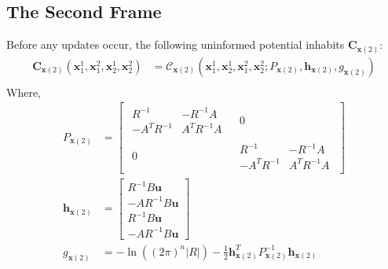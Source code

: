 \subsection{The Second Frame}
\label{subsection:the_second_frame}
Before any updates occur, the following uninformed potential inhabits $\pmb{C}_{\pmb{x}(2)}$:
\begin{align*}
\pmb{C}_{\pmb{x} \left( 2 \right)} \left( \pmb{x}_{1}^{1},  \pmb{x}_{1}^{2}, \pmb{x}_{2}^{1},  \pmb{x}_{2}^{2} \right) &=  \mathcal{C}_{\pmb{x}(2)} \left( \pmb{x}_{1}^{1},  \pmb{x}_{2}^{1} ,  \pmb{x}_{1}^{2} ,  \pmb{x}_{2}^{2} ; P_{\pmb{x}(2)}, \pmb{h}_{\pmb{x}(2)}, g_{\pmb{x}(2)}   \right) \\
\end{align*}
Where,
\begin{align}
P_{\pmb{x}(2)} &= \begin{bmatrix}
\begin{matrix} R^{-1} & -R^{-1} A \\ -A^{T} R^{-1} & A^{T} R^{-1} A \end{matrix} & \begin{matrix} 0 \end{matrix} \\
\begin{matrix} 0 \end{matrix} & \begin{matrix} R^{-1} & -R^{-1} A \\ -A^{T} R^{-1} & A^{T} R^{-1} A \end{matrix}
\end{bmatrix} \\
\pmb{h}_{\pmb{x}(2)} &= \begin{bmatrix}
R^{-1} B \pmb{u} \\
-A R^{-1} B \pmb{u} \\
R^{-1} B \pmb{u} \\
-A R^{-1} B \pmb{u} 
\end{bmatrix} \\
g_{\pmb{x}(2)} &= -\ln( (2\pi)^{n} | R | ) - \frac{1}{2} \pmb{h}_{\pmb{x}(2)}^{T} P_{\pmb{x}(2)}^{-1} \pmb{h}_{\pmb{x}(2)}
\end{align}

